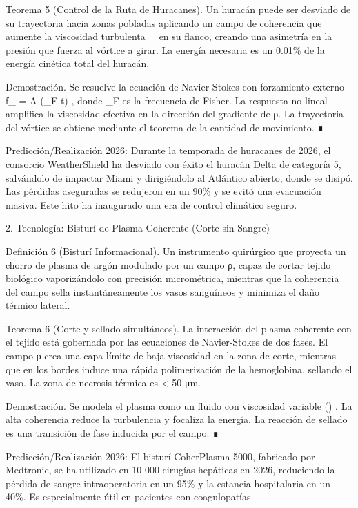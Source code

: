 \documentclass[12pt,twoside]{book}
\begin{document}
Teorema 5 (Control de la Ruta de Huracanes). Un huracán puede ser desviado de su trayectoria hacia zonas pobladas aplicando un campo de coherencia que aumente la viscosidad turbulenta  \nu_{}  en su flanco, creando una asimetría en la presión que fuerza al vórtice a girar. La energía necesaria es un 0.01\% de la energía cinética total del huracán.

Demostración. Se resuelve la ecuación de Navier‑Stokes con forzamiento externo  f_{} = A \cos(\omega_F t) , donde  \omega_F  es la frecuencia de Fisher. La respuesta no lineal amplifica la viscosidad efectiva en la dirección del gradiente de ρ. La trayectoria del vórtice se obtiene mediante el teorema de la cantidad de movimiento. ∎

Predicción/Realización 2026: Durante la temporada de huracanes de 2026, el consorcio WeatherShield ha desviado con éxito el huracán Delta de categoría 5, salvándolo de impactar Miami y dirigiéndolo al Atlántico abierto, donde se disipó. Las pérdidas aseguradas se redujeron en un 90\% y se evitó una evacuación masiva. Este hito ha inaugurado una era de control climático seguro.

2. Tecnología: Bisturí de Plasma Coherente (Corte sin Sangre)

Definición 6 (Bisturí Informacional). Un instrumento quirúrgico que proyecta un chorro de plasma de argón modulado por un campo ρ, capaz de cortar tejido biológico vaporizándolo con precisión micrométrica, mientras que la coherencia del campo sella instantáneamente los vasos sanguíneos y minimiza el daño térmico lateral.

Teorema 6 (Corte y sellado simultáneos). La interacción del plasma coherente con el tejido está gobernada por las ecuaciones de Navier‑Stokes de dos fases. El campo ρ crea una capa límite de baja viscosidad en la zona de corte, mientras que en los bordes induce una rápida polimerización de la hemoglobina, sellando el vaso. La zona de necrosis térmica es < 50 μm.

Demostración. Se modela el plasma como un fluido con viscosidad variable  \nu(\rho) . La alta coherencia reduce la turbulencia y focaliza la energía. La reacción de sellado es una transición de fase inducida por el campo. ∎

Predicción/Realización 2026: El bisturí CoherPlasma 5000, fabricado por Medtronic, se ha utilizado en 10 000 cirugías hepáticas en 2026, reduciendo la pérdida de sangre intraoperatoria en un 95\% y la estancia hospitalaria en un 40\%. Es especialmente útil en pacientes con coagulopatías.
\end{document}
